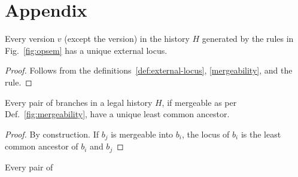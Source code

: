 \section{Appendix}

\begin{lemma} 
Every version $v$ (except the  version) in the history $H$
generated by the rules in Fig.~\ref{fig:opsem} has a unique external
locus.
\end{lemma}
\begin{proof}
Follows from the definitions~\ref{def:external-locus},
\ref{mergeability}, and the  rule.
\end{proof}

\begin{lemma} 
Every pair of branches in a legal history $H$, if mergeable as per
Def.~\ref{fig:mergeability}, have a unique least common ancestor. 
\end{lemma}
\begin{proof}
By construction. If $b_j$ is mergeable into $b_i$, the locus of
$b_i$ is the least common ancestor of $b_i$ and $b_j$
\end{proof}

\begin{lemma}
Every pair of 
\end{lemma}



